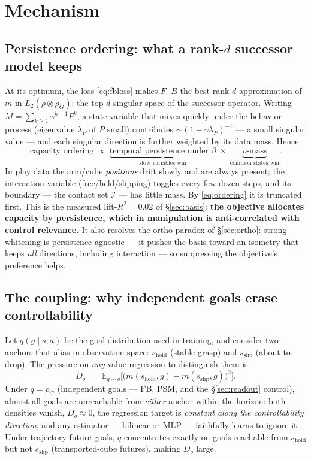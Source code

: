 \documentclass[11pt,a4paper]{article}
\newcommand{\E}{\mathbb{E}}
\begin{document}
\section{Mechanism}\label{sec:mech}

\subsection{Persistence ordering: what a rank-$d$ successor model keeps}\label{sec:persistence}
At its optimum, the loss \eqref{eq:fbloss} makes $F^{\top}B$ the best rank-$d$ approximation of
$m$ in $L_2(\rho\otimes\rho_G)$: the top-$d$ singular space of the successor operator. Writing
$M=\sum_{k\ge1}\gamma^{k-1}P^{k}$, a state variable that mixes quickly under the behavior process
(eigenvalue $\lambda_P$ of $P$ small) contributes $\sim(1-\gamma\lambda_P)^{-1}$ --- a small
singular value --- and each singular direction is further weighted by its data mass. Hence
\begin{equation}
\text{capacity ordering}\;\propto\;\underbrace{\text{temporal persistence under }\beta}_{\text{slow variables win}}
\;\times\;\underbrace{\rho\text{-mass}}_{\text{common states win}}.
\label{eq:ordering}
\end{equation}
In play data the arm/cube \emph{positions} drift slowly and are always present; the interaction
variable (free/held/slipping) toggles every few dozen steps, and its boundary --- the contact set
$\mathcal{I}$ --- has little mass. By \eqref{eq:ordering} it is truncated first. This is the
measured lift-$R^{2}=0.02$ of \S\ref{sec:basis}: \textbf{the objective allocates capacity by
persistence, which in manipulation is anti-correlated with control relevance.} It also resolves
the ortho paradox of \S\ref{sec:ortho}: strong whitening is persistence-agnostic --- it pushes the
basis toward an isometry that keeps \emph{all} directions, including interaction --- so
suppressing the objective's preference helps.

\subsection{The coupling: why independent goals erase controllability}\label{sec:coupling}
Let $q(g\mid s,a)$ be the goal distribution used in training, and consider two anchors that alias
in observation space: $s_{\mathrm{hold}}$ (stable grasp) and $s_{\mathrm{slip}}$ (about to drop).
The pressure on \emph{any} value regression to distinguish them is
\begin{equation}
D_q\;=\;\E_{g\sim q}\Big[\big(m(s_{\mathrm{hold}},g)-m(s_{\mathrm{slip}},g)\big)^{2}\Big].
\label{eq:dq}
\end{equation}
Under $q=\rho_G$ (independent goals --- FB, PSM, and the \S\ref{sec:readout} control), almost all
goals are unreachable from \emph{either} anchor within the horizon: both densities vanish,
$D_q\approx0$, the regression target is \emph{constant along the controllability direction}, and
any estimator --- bilinear or MLP --- faithfully learns to ignore it. Under trajectory-future
goals, $q$ concentrates exactly on goals reachable from $s_{\mathrm{hold}}$ but not
$s_{\mathrm{slip}}$ (transported-cube futures), making $D_q$ large.
\end{document}
